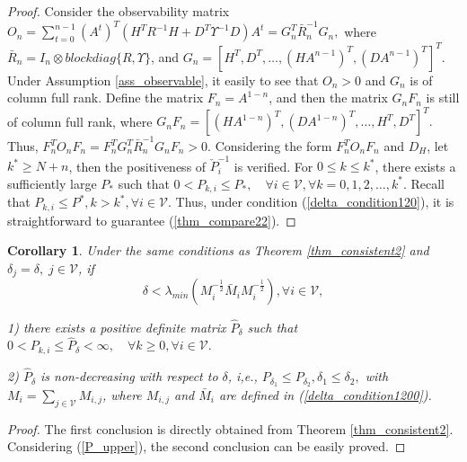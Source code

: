 \documentclass[journal,transmag]{IEEEtran}
\newtheorem{corollary}{\textbf{Corollary}}
\begin{document}
{\begin{proof}
		
		
		Consider the observability matrix  \\$ O_{n}=\sum_{t=0}^{n-1}(A^t)^{T}(H^TR^{-1}H+D^T\Upsilon^{-1}D)A^{t}=G_{n}^T \bar R_{n}^{-1}G_{n},$
		where $\bar R_{n}=I_{n}\otimes blockdiag\{R,\Upsilon\}$,  and
		$	G_{n}=\left[H^T,D^T,\ldots,(HA^{n-1})^T,(DA^{n-1})^T \right]^T$.
		Under Assumption \ref{ass_observable}, it easily to see that $O_{n}>0$ and $G_{n}$ is of column full rank.
		Define the matrix $F_{n}=A^{1-n}$, and then the matrix $G_{n}F_{n}$ is still of column full rank, where
		$G_{n}F_{n}=\left[(HA^{1-n})^T ,(DA^{1-n})^T  ,\ldots, H^T,D^T \right]^T.  $	
		Thus, $F_{n}^TO_{n}F_{n}=F_{n}^TG_{n}^T \bar R_{n}^{-1}G_{n}F_{n}>0$.	
		Considering the form $F_{n}^TO_{n}F_{n}$ and $D_H$,
		let $k^{*}\geq N+n$, then the positiveness of $\check{P}_{i}^{-1}$ is verified.
		For $0\leq k\leq k^{*}$, there exists a sufficiently large $P_{*}$ such that $0<P_{k,i}\leq P_{*}, \quad \forall i\in \mathcal{V}, \forall k=0,1,2,\ldots,k^{*}.$ Recall that $P_{k,i}\leq P^*, k>k^*,\forall i\in \mathcal{V}$.
		Thus, under  condition (\ref{delta_condition120}), it is straightforward to guarantee  (\ref{thm_compare22}).	
	\end{proof}
	

	
	
	{
	\begin{corollary}\label{cor1}
		Under the same conditions as  Theorem \ref{thm_consistent2} and  $\delta_{j}=\delta,\; j\in \mathcal{V}$, if
		\begin{equation}\label{design_interval}
		\delta
		<\lambda_{min}(M_{i}^{-\frac{1}{2}}\bar M_{i}M_{i}^{-\frac{1}{2}}), \forall  i\in \mathcal{V},
		\end{equation}	
		\item 1) there exists a positive definite matrix $\hat P_{\delta}$ such that $0<P_{k,i}\leq \hat P_{\delta}<\infty, \quad  \forall k\geq 0, \forall i\in \mathcal{V}.$
		\item 2) $\hat P_{\delta}$ is non-decreasing with respect to $\delta$, i,e., $P_{\delta_1}\leq P_{\delta_2},\delta_1\leq \delta_2,$
			with $M_{i}=\sum_{j\in \mathcal{V}}M_{i,j}$, where $M_{i,j}$ and $\bar M_{i}$ are defined in  (\ref{delta_condition1200}).
	\end{corollary}
	\begin{proof}
		The first conclusion is directly obtained from Theorem \ref{thm_consistent2}. Considering (\ref{P_upper}), the second conclusion can be easily proved.
	\end{proof}
}

}
\end{document}
